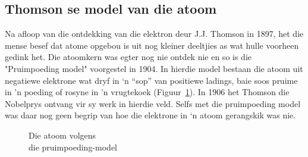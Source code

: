       \label{m38756*uid1}
            \subsection*{Thomson se model van die atoom}
            \nopagebreak
\begin{minipage}{.5\textwidth}
        \label{m38756*id254616}
Na afloop van die ontdekking van die elektron deur J.J. Thomson in 1897, het die mense besef dat atome opgebou is uit nog kleiner deeltjies as wat hulle voorheen gedink het. Die atoomkern was egter nog nie ontdek nie en so is die "Pruimpoeding model" voorgestel in 1904. In hierdie model bestaan die atoom uit negatiewe elektrone wat dryf in ‘n “sop” van positiewe ladings, baie soos pruime in 'n poeding of rosyne in 'n vrugtekoek (Figuur~\ref{fig:atom:plumpudding}). In 1906 het Thomson die Nobelprys ontvang vir sy werk in hierdie veld. Selfs met die pruimpoeding model was daar nog geen begrip van hoe die elektrone in ‘n atoom gerangskik was nie.\\ 
\end{minipage}
\begin{minipage}{.5\textwidth}
    \setcounter{subfigure}{0}
	\begin{figure}[H] %
    \begin{center}
\begin{minipage}{.8\textwidth}
\caption{Die atoom volgens \\ die pruimpoeding-model}
\end{minipage}
\label{fig:atom:plumpudding}
\end{center}
 \end{figure}    
\end{minipage}   
